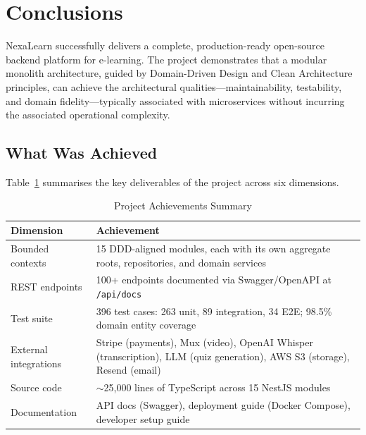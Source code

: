 
\section{Conclusions}
\label{sec:conclusions}

NexaLearn successfully delivers a complete, production-ready open-source backend platform for e-learning. The project demonstrates that a modular monolith architecture, guided by Domain-Driven Design and Clean Architecture principles, can achieve the architectural qualities---maintainability, testability, and domain fidelity---typically associated with microservices without incurring the associated operational complexity.

\subsection{What Was Achieved}

Table~\ref{tab:achievements} summarises the key deliverables of the project across six dimensions.

\begin{table}[H]
  \centering
  \caption{Project Achievements Summary}\label{tab:achievements}
  \small
  \begin{tabular}{lp{8cm}}
    \toprule
    \textbf{Dimension} & \textbf{Achievement} \\
    \midrule
    Bounded contexts & 15 DDD-aligned modules, each with its own aggregate roots, repositories, and domain services \\
    REST endpoints    & 100+ endpoints documented via Swagger/OpenAPI at \texttt{/api/docs} \\
    Test suite        & 396 test cases: 263 unit, 89 integration, 34 E2E; 98.5\% domain entity coverage \\
    External integrations & Stripe (payments), Mux (video), OpenAI Whisper (transcription), LLM (quiz generation), AWS S3 (storage), Resend (email) \\
    Source code       & $\sim$25,000 lines of TypeScript across 15 NestJS modules \\
    Documentation     & API docs (Swagger), deployment guide (Docker Compose), developer setup guide \\
    \bottomrule
  \end{tabular}
\end{table}

